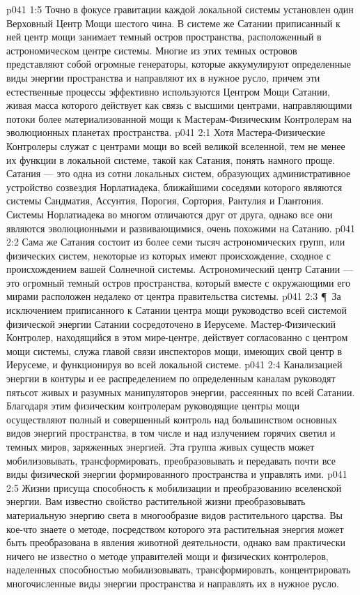\vs p041 1:5 Точно в фокусе гравитации каждой локальной системы установлен один Верховный Центр Мощи шестого чина. В системе же Сатании приписанный к ней центр мощи занимает темный остров пространства, расположенный в астрономическом центре системы. Многие из этих темных островов представляют собой огромные генераторы, которые аккумулируют определенные виды энергии пространства и направляют их в нужное русло, причем эти естественные процессы эффективно используются Центром Мощи Сатании, живая масса которого действует как связь с высшими центрами, направляющими потоки более материализованной мощи к Мастерам\hyp{}Физическим Контролерам на эволюционных планетах пространства.
\vs p041 2:1 Хотя Мастера\hyp{}Физические Контролеры служат с центрами мощи во всей великой вселенной, тем не менее их функции в локальной системе, такой как Сатания, понять намного проще. Сатания --- это одна из сотни локальных систем, образующих административное устройство созвездия Норлатиадека, ближайшими соседями которого являются системы Сандматия, Ассунтия, Порогия, Сортория, Рантулия и Глантония. Системы Норлатиадека во многом отличаются друг от друга, однако все они являются эволюционными и развивающимися, очень похожими на Сатанию.
\vs p041 2:2 Сама же Сатания состоит из более семи тысяч астрономических групп, или физических систем, некоторые из которых имеют происхождение, сходное с происхождением вашей Солнечной системы. Астрономический центр Сатании --- это огромный темный остров пространства, который вместе с окружающими его мирами расположен недалеко от центра правительства системы.
\vs p041 2:3 \P\ За исключением приписанного к Сатании центра мощи руководство всей системой физической энергии Сатании сосредоточено в Иерусеме. Мастер\hyp{}Физический Контролер, находящийся в этом мире\hyp{}центре, действует согласованно с центром мощи системы, служа главой связи инспекторов мощи, имеющих свой центр в Иерусеме, и функционируя во всей локальной системе.
\vs p041 2:4 Канализацией энергии в контуры и ее распределением по определенным каналам руководят пятьсот живых и разумных манипуляторов энергии, рассеянных по всей Сатании. Благодаря этим физическим контролерам руководящие центры мощи осуществляют полный и совершенный контроль над большинством основных видов энергий пространства, в том числе и над излучением горячих светил и темных миров, заряженных энергией. Эта группа живых существ может мобилизовывать, трансформировать, преобразовывать и передавать почти все виды физической энергии формированного пространства и управлять ими.
\vs p041 2:5 Жизни присуща способность к мобилизации и преобразованию вселенской энергии. Вам известно свойство растительной жизни преобразовывать материальную энергию света в многообразие видов растительного царства. Вы кое\hyp{}что знаете о методе, посредством которого эта растительная энергия может быть преобразована в явления животной деятельности, однако вам практически ничего не известно о методе управителей мощи и физических контролеров, наделенных способностью мобилизовывать, трансформировать, концентрировать многочисленные виды энергии пространства и направлять их в нужное русло.
